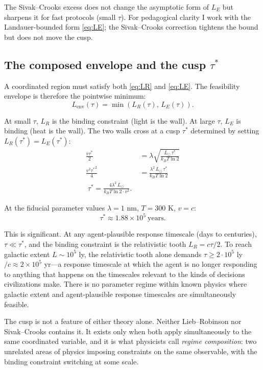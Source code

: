 \documentclass[11pt,twocolumn]{article}
\newcommand{\Lenv}{L_{\text{env}}}
\newcommand{\LR}{L_R}
\newcommand{\LE}{L_E}
\newcommand{\taustar}{{\tau^{*}}}
\newcommand{\kBT}{k_{B}T}
\newcommand{\Lsun}{L_{\odot}}
\begin{document}
The Sivak--Crooks excess does not change the asymptotic form of $\LE$ but
sharpens it for fast protocols (small $\tau$). For pedagogical clarity I
work with the Landauer-bounded form \eqref{eq:LE}; the Sivak--Crooks
correction tightens the bound but does not move the cusp.

\subsection{The composed envelope and the cusp $\taustar$}

A coordinated region must satisfy both \eqref{eq:LR} and \eqref{eq:LE}.
The feasibility envelope is therefore the pointwise minimum:
\begin{equation}
\Lenv(\tau) = \min\!\left(\LR(\tau),\,\LE(\tau)\right).
\label{eq:Lenv}
\end{equation}

At small $\tau$, $\LR$ is the binding constraint (light is the wall). At
large $\tau$, $\LE$ is binding (heat is the wall). The two walls cross
at a cusp $\taustar$ determined by setting $\LR(\taustar) = \LE(\taustar)$:
\begin{align}
\frac{v\taustar}{2} &= \lambda\sqrt{\frac{\Lsun\,\taustar}{\kBT \ln 2}} \\
\frac{v^{2}\taustar^{2}}{4} &= \frac{\lambda^{2}\,\Lsun\,\taustar}{\kBT \ln 2} \\
\boxed{\;\taustar = \frac{4\lambda^{2}\,\Lsun}{\kBT \ln 2 \cdot v^{2}}.\;}
\label{eq:taustar}
\end{align}

At the fiducial parameter values $\lambda = 1$ nm, $T = 300$ K, $v = c$:
\begin{equation}
\taustar \approx 1.88 \times 10^{5}~\text{years.}
\end{equation}

This is significant. At any agent-plausible response timescale (days to
centuries), $\tau \ll \taustar$, and the binding constraint is the
relativistic tooth $\LR = c\tau/2$. To reach galactic extent
$L \sim 10^{5}$ ly, the relativistic tooth alone demands
$\tau \ge 2 \cdot 10^{5}$ ly $/c \approx 2 \times 10^{5}$ yr—a response
timescale at which the agent is no longer responding to anything that
happens on the timescales relevant to the kinds of decisions civilizations
make. There is no parameter regime within known physics where galactic
extent and agent-plausible response timescales are simultaneously feasible.

The cusp is not a feature of either theory alone. Neither Lieb--Robinson
nor Sivak--Crooks contains it. It exists only when both apply
simultaneously to the same coordinated variable, and it is what
physicists call \emph{regime composition}: two unrelated areas of physics
imposing constraints on the same observable, with the binding constraint
switching at some scale.
\end{document}
